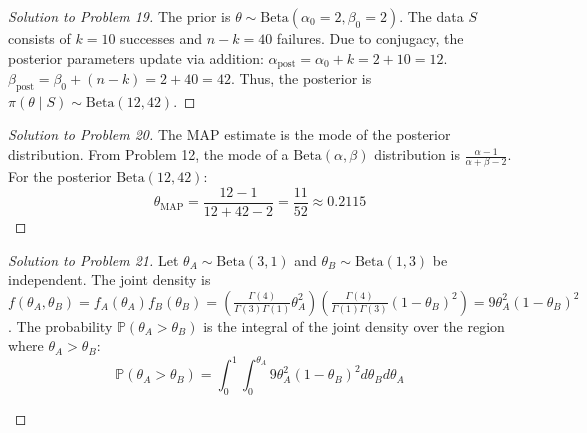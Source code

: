 \documentclass[11pt, a4paper]{article}
\theoremstyle{definition}
\theoremstyle{remark}
\newcommand{\Prob}{\mathbb{P}}
\begin{document}
\begin{proof}[Solution to Problem 19]
The prior is $\theta \sim \text{Beta}(\alpha_0=2, \beta_0=2)$.
The data $S$ consists of $k=10$ successes and $n-k = 40$ failures.
Due to conjugacy, the posterior parameters update via addition:
$\alpha_{\text{post}} = \alpha_0 + k = 2 + 10 = 12$.
$\beta_{\text{post}} = \beta_0 + (n-k) = 2 + 40 = 42$.
Thus, the posterior is $\pi(\theta \mid S) \sim \text{Beta}(12, 42)$.
\end{proof}

\begin{proof}[Solution to Problem 20]
The MAP estimate is the mode of the posterior distribution.
From Problem 12, the mode of a $\text{Beta}(\alpha, \beta)$ distribution is $\frac{\alpha-1}{\alpha+\beta-2}$.
For the posterior $\text{Beta}(12, 42)$:
\[
\theta_{\text{MAP}} = \frac{12-1}{12+42-2} = \frac{11}{52} \approx 0.2115
\]
\end{proof}

\begin{proof}[Solution to Problem 21]
Let $\theta_A \sim \text{Beta}(3, 1)$ and $\theta_B \sim \text{Beta}(1, 3)$ be independent.
The joint density is $f(\theta_A, \theta_B) = f_A(\theta_A) f_B(\theta_B) = \left( \frac{\Gamma(4)}{\Gamma(3)\Gamma(1)} \theta_A^2 \right) \left( \frac{\Gamma(4)}{\Gamma(1)\Gamma(3)} (1-\theta_B)^2 \right) = 9 \theta_A^2 (1-\theta_B)^2$.
The probability $\Prob(\theta_A > \theta_B)$ is the integral of the joint density over the region where $\theta_A > \theta_B$:
\[
\Prob(\theta_A > \theta_B) = \int_0^1 \int_0^{\theta_A} 9 \theta_A^2 (1-\theta_B)^2 d\theta_B d\theta_A
\]

\begin{center}
\end{center}
\end{proof}
\end{document}
